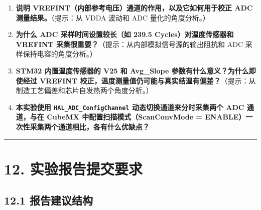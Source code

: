\documentclass[
  chinese,
  UTF8,
  oneside,
  openany]{ctexbook}
\providecommand{\tightlist}{%
  \setlength{\itemsep}{0pt}\setlength{\parskip}{0pt}}
\begin{document}
\begin{enumerate}
\def\labelenumi{\arabic{enumi}.}
\tightlist
\item
  \textbf{说明 VREFINT（内部参考电压）通道的作用，以及它如何用于校正 ADC
  测量结果。}（提示：从 VDDA 波动和 ADC 量化的角度分析。）
\item
  \textbf{为什么 ADC 采样时间设置较长（如 239.5 Cycles）对温度传感器和
  VREFINT 采集很重要？}（提示：从内部模拟信号源的输出阻抗和 ADC
  采样保持电容的角度分析。）
\item
  \textbf{STM32 内置温度传感器的 V25 和 Avg\_Slope
  参数有什么意义？为什么即使经过 VREFINT
  校正，温度测量值仍可能与真实结温有偏差？}（提示：从制造工艺偏差和芯片自发热两个角度分析。）
\item
  \textbf{本实验使用 \texttt{HAL\_ADC\_ConfigChannel}
  动态切换通道来分时采集两个 ADC 通道，与在 CubeMX
  中配置扫描模式（ScanConvMode =
  ENABLE）一次性采集两个通道相比，各有什么优缺点？}
\end{enumerate}

\begin{center}\rule{0.5\linewidth}{0.5pt}\end{center}

\section{12.
实验报告提交要求}\label{ux5b9eux9a8cux62a5ux544aux63d0ux4ea4ux8981ux6c42-1}

\subsection{12.1
报告建议结构}\label{ux62a5ux544aux5efaux8baeux7ed3ux6784-4}
\end{document}
